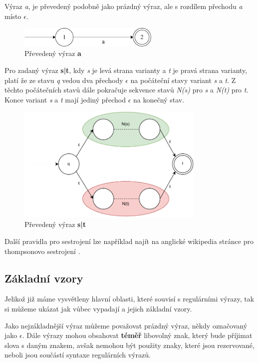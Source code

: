 Výraz \textit{a}, je převedený podobně jako prázdný výraz, ale s rozdílem přechodu \textit{a} místo \textit{$\epsilon$}.
\begin{figure}[!h]
	\centering
	\includegraphics[width=0.6\textwidth]{Figures/NFA_a.pdf}
	\caption{Převedený výraz \textbf{a}}
	\label{fig:NFAa}
\end{figure}

Pro zadaný výraz \textbf{s|t}, kdy \textit{s} je levá strana varianty a \textit{t} je pravá strana varianty, platí že ze stavu \textit{q} vedou dva přechody
\textit{$\epsilon$} na počáteční stavy variant \textit{s} a \textit{t}. Z těchto počátečních stavů dále pokračuje sekvence stavů \textit{N(s)} pro \textit{s} a \textit{N(t)} pro \textit{t}.
Konce variant \textit{s} a \textit{t} mají jediný přechod \textit{$\epsilon$} na konečný stav.
\begin{figure}[!h]
	\centering
	\includegraphics[width=0.8\textwidth]{Figures/NFA_union.pdf}
	\caption{Převedený výraz \textbf{s|t}}
	\label{fig:NFAunion}
\end{figure}

Další pravidla pro sestrojení lze například najít na anglické wikipedia stránce pro thompsonovo sestrojení \cite{Wikipedia_2023}.

\subsection*{Základní vzory}
Jelikož již máme vysvětleny hlavní oblasti, které souvisí s regulárními výrazy, tak si můžeme ukázat 
jak vůbec vypadají a jejich základní vzory.

Jako nejzákladnější výraz můžeme považovat prázdný výraz, někdy označovaný jako $\epsilon$. 
Dále výrazy mohou obsahovat \textbf{téměř} libovolný znak, který bude příjimat slova s daným znakem, avšak nemohou být použity znaky, které jsou rezervované, neboli jsou součástí syntaxe regulárních výrazů.

